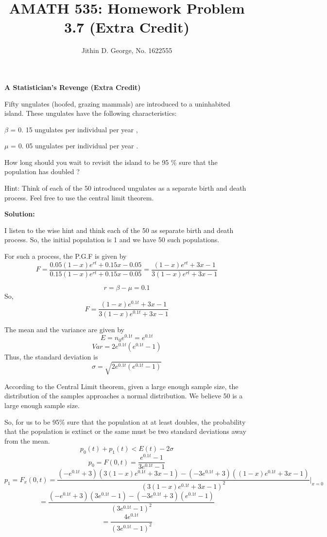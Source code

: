 \documentclass[a4paper,12pt]{article}
\title{\normalsize AMATH 535: Homework Problem 3.7 (Extra Credit)}
\author{\normalsize Jithin D. George, No. 1622555}
\begin{document}
\maketitle
	
{\bf A Statistician’s Revenge (Extra Credit)	} 


Fifty ungulates (hoofed, grazing mammals) are introduced to a
uninhabited island. These ungulates have the following characteristics:

$\beta$ = 0. 15 ungulates per individual per year ,

$\mu$ = 0. 05 ungulates per individual per year .

How long should you wait to revisit the island to be 95 \% sure that the
population has doubled ?

Hint: Think of each of the 50 introduced ungulates as a separate birth
and death process. Feel free to use the central limit theorem.

{\bf Solution:	}


I listen to the wise hint and think each of the 50 as separate birth and death process. So, the initial population is 1 and we have 50 such populations.

For such a process, the P.G.F is given by
\[ F = \frac{0.05(1-x)e^{rt} + 0.15x-0.05}{0.15(1-x)e^{rt} + 0.15x-0.05} =  \frac{(1-x)e^{rt} + 3x-1}{3(1-x)e^{rt} + 3x-1} \]

\[r = \beta - \mu = 0.1 \]
So,
\[ F =  \frac{(1-x)e^{0.1t} + 3x-1}{3(1-x)e^{0.1t} + 3x-1} \]

The mean and the variance are given by
\[E = n_0 e^{0.1t}= e^{0.1t} \]
\[Var = 2e^{0.1t}(e^{0.1t}- 1) \]
Thus, the standard deviation is 
\[ \sigma = \sqrt{2e^{0.1t}(e^{0.1t}- 1)}\]

According to the Central Limit theorem, given a large enough sample size, the distribution of the samples approaches a normal distribution. We believe 50 is a large enough sample size.

So, for us to be 95\% sure that the population at at least doubles, the probability that the population is extinct or the same must be two standard deviations away from the mean.
\[p_0(t) +p_1(t) < E(t) - 2\sigma \]
\[p_0 = F(0,t) = \frac{e^{0.1t} -1}{3e^{0.1t} -1}\]
\[p_1 = F_x(0,t) = \frac{(-e^{0.1t} + 3)(3(1-x)e^{0.1t} + 3x-1) -(-3e^{0.1t} + 3)((1-x)e^{0.1t} + 3x-1)}{(3(1-x)e^{0.1t} + 3x-1)^2} \big|_{x=0} \]
\[ =  \frac{(-e^{0.1t} + 3)(3e^{0.1t} -1) -(-3e^{0.1t} + 3)(e^{0.1t}  -1)}{(3e^{0.1t} -1)^2}\]
\[ =  \frac{4e^{0.1t}}{(3e^{0.1t} -1)^2}\]
\end{document}
